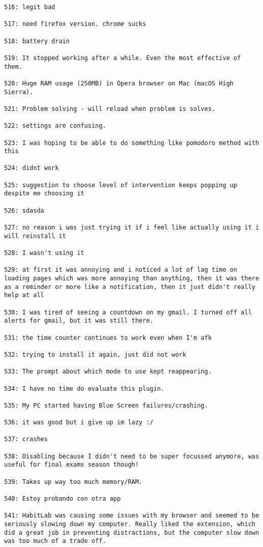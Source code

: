 \begin{lstlisting}[breaklines]
516: legit bad

517: need firefox version. chrome sucks

518: battery drain

519: It stopped working after a while. Even the most effective of them.

520: Huge RAM usage (250MB) in Opera browser on Mac (macOS High Sierra).

521: Problem solving - will reload when problem is solves.

522: settings are confusing.

523: I was hoping to be able to do something like pomodoro method with this

524: didnt work

525: suggestion to choose level of intervention keeps popping up despite me choosing it

526: sdasda

527: no reason i was just trying it if i feel like actually using it i will reinstall it

528: I wasn't using it

529: at first it was annoying and i noticed a lot of lag time on loading pages which was more annoying than anything, then it was there as a reminder or more like a notification, then it just didn't really help at all

530: I was tired of seeing a countdown on my gmail. I turned off all alerts for gmail, but it was still there.

531: the time counter continues to work even when I'm afk

532: trying to install it again, just did not work

533: The prompt about which mode to use kept reappearing.

534: I have no time do evaluate this plugin.

535: My PC started having Blue Screen failures/crashing.

536: it was good but i give up im lazy :/

537: crashes

538: Disabling because I didn't need to be super focussed anymore, was useful for final exams season though!

539: Takes up way too much memory/RAM.

540: Estoy probando con otra app

541: HabitLab was causing some issues with my browser and seemed to be seriously slowing down my computer. Really liked the extension, which did a great job in preventing distractions, but the computer slow down was too much of a trade off.


\end{lstlisting}
